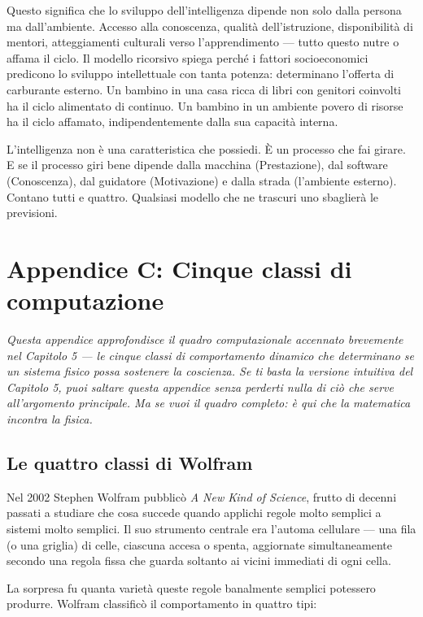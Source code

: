 \documentclass[11pt, twoside, openright]{book}
\begin{document}
Questo significa che lo sviluppo dell'intelligenza dipende non solo dalla persona ma dall'ambiente. Accesso alla conoscenza, qualità dell'istruzione, disponibilità di mentori, atteggiamenti culturali verso l'apprendimento --- tutto questo nutre o affama il ciclo. Il modello ricorsivo spiega perché i fattori socioeconomici predicono lo sviluppo intellettuale con tanta potenza: determinano l'offerta di carburante esterno. Un bambino in una casa ricca di libri con genitori coinvolti ha il ciclo alimentato di continuo. Un bambino in un ambiente povero di risorse ha il ciclo affamato, indipendentemente dalla sua capacità interna.

L'intelligenza non è una caratteristica che possiedi. È un processo che fai girare. E se il processo giri bene dipende dalla macchina (Prestazione), dal software (Conoscenza), dal guidatore (Motivazione) e dalla strada (l'ambiente esterno). Contano tutti e quattro. Qualsiasi modello che ne trascuri uno sbaglierà le previsioni.


\chapter*{Appendice C: Cinque classi di computazione}

\textit{Questa appendice approfondisce il quadro computazionale accennato brevemente nel Capitolo 5 --- le cinque classi di comportamento dinamico che determinano se un sistema fisico possa sostenere la coscienza. Se ti basta la versione intuitiva del Capitolo 5, puoi saltare questa appendice senza perderti nulla di ciò che serve all'argomento principale. Ma se vuoi il quadro completo: è qui che la matematica incontra la fisica.}

\section*{Le quattro classi di Wolfram}

Nel 2002 Stephen Wolfram pubblicò \textit{A New Kind of Science}, frutto di decenni passati a studiare che cosa succede quando applichi regole molto semplici a sistemi molto semplici. Il suo strumento centrale era l'automa cellulare --- una fila (o una griglia) di celle, ciascuna accesa o spenta, aggiornate simultaneamente secondo una regola fissa che guarda soltanto ai vicini immediati di ogni cella.

La sorpresa fu quanta varietà queste regole banalmente semplici potessero produrre. Wolfram classificò il comportamento in quattro tipi:
\end{document}
